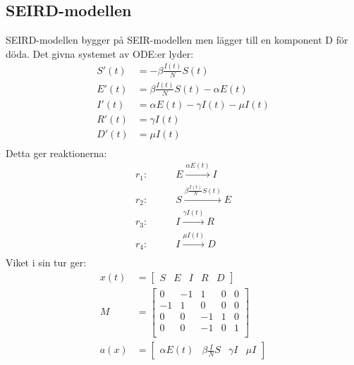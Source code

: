 \documentclass[11pt,a4paper]{article}
\begin{document}
\subsection{SEIRD-modellen}
SEIRD-modellen bygger på SEIR-modellen men lägger till en komponent D för döda.
Det givna systemet av ODE:er lyder:
\begin{align*}
    S'(t) & = -\beta \frac{I(t)}{N} S(t)              \\
    E'(t) & = \beta \frac{I(t)}{N} S(t) - \alpha E(t) \\
    I'(t) & = \alpha E(t) - \gamma I(t) - \mu I(t)    \\
    R'(t) & = \gamma I(t)                             \\
    D'(t) & = \mu I(t)                                \\
\end{align*}
Detta ger reaktionerna:
\begin{align*}
    r_1: \qquad & E \xrightarrow{\alpha E(t)} I               \\
    r_2: \qquad & S \xrightarrow{\beta \frac{I(t)}{N} S(t)} E \\
    r_3: \qquad & I \xrightarrow{\gamma I(t)} R               \\
    r_4: \qquad & I \xrightarrow{\mu I(t)} D                  \\
\end{align*}
Viket i sin tur ger:
\begin{align*}
    x(t) & = \begin{bmatrix} S & E & I & R & D \end{bmatrix}                                    \\
    M    & = \begin{bmatrix}
                 0  & -1 & 1  & 0 & 0 \\
                 -1 & 1  & 0  & 0 & 0 \\
                 0  & 0  & -1 & 1 & 0 \\
                 0  & 0  & -1 & 0 & 1 \\
             \end{bmatrix}                                                               \\
    a(x) & = \begin{bmatrix} \alpha E(t) & \beta \frac{I}{N} S & \gamma I & \mu I \end{bmatrix} \\
\end{align*}
\end{document}
